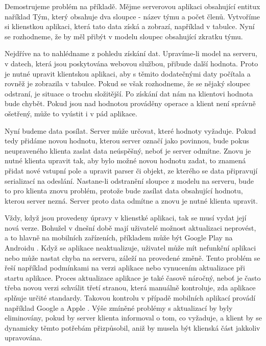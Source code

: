 Demostrujeme problém na příkladě. Mějme serverovou aplikaci obsahující entitux naříklad Tým, který obsahuje dva sloupce - název týmu a počet členů. Vytvoříme si klienstkou aplikaci, která tato data získá a zobrazí, například v tabulce. Nyní se rozhodneme, že by měl přibýt v modelu sloupec obsahující zkratku týmu. 

Nejdříve na to nahlédname z pohledu získání dat. Upravíme-li model na serveru, v datech, která jsou poskytována webovou službou, přibude další hodnota. Proto je nutné upravit klientskou aplikaci, aby s těmito dodatečnými daty počítala a rovněž je zobrazila v tabulce. Pokud se však rozhodneme, že se nějaký sloupec odstraní, je situace o trochu složitější. Po získání dat nám na klientovi hodnota bude chybět. Pokud jsou nad hodnotou prováděny operace a klient není správně ošetřený, může to vyústit i v pád aplikace.

Nyní budeme data posílat. Server může určovat, které hodnoty vyžaduje. Pokud tedy přidáme novou hodnotu, kterou server označí jako povinnou, bude pokus neupraveného klienta zaslat data neúspěšný, neboť je server odmítne. Znovu je nutné klienta upravit tak, aby bylo možné novou hodnotu zadat, to znamená přidat nové vstupní pole a upravit parser či objekt, ze kterého se data připravují serializací na odeslání. Nastane-li odstranění sloupce z modelu na serveru, bude to pro klienta znovu problém, protože bude zasílat data obsahující hodnotu, kterou server nezná. Server proto data odmítne a znovu je nutné klienta upravit. 

Vždy, když jsou provedeny úpravy v klienstké aplikaci, tak se musí vydat její nová verze. Bohužel v dnešní době mají uživatelé možnost aktualizaci neprovést, a to hlavně na mobilních zařízeních, příkladem může být Google Play na Androidu \cite{android-auto-update}. Když se aplikace neaktualizuje, uživatel může mít nefunkční aplikaci nebo může nastat chyba na serveru, záleží na provedené změně. Tento problém se řeší například podmínkami na verzi aplikace nebo vynucením aktualizace při startu aplikace. Proces aktualizace aplikace je také časově náročný, neboť je často třeba novou verzi schválit třetí stranou, která manuálně kontroluje, zda aplikace splňuje určité standardy. Takovou kontrolu v případě mobilních aplikací provádí například Google a Apple \cite{app-approval}. Výše zmíněné problémy s aktualizací by byly eliminovány, pokud by server klienta informoval o tom, co vyžaduje, a klient by se dynamicky těmto potřebám přizpůsobil, aniž by musela být klienská část jakkoliv upravována.

